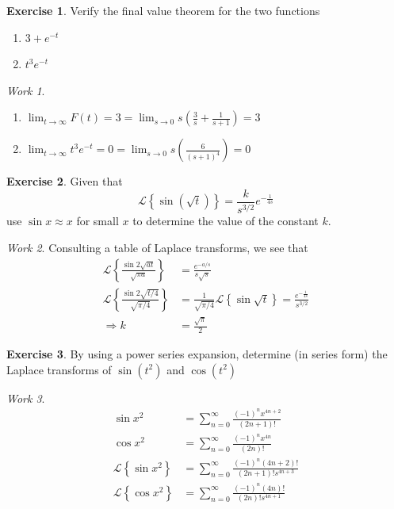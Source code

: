 \documentclass{report}
\theoremstyle{definition}
\newtheorem{exercise}{Exercise}[chapter]
\theoremstyle{remark}
\newtheorem*{work}{Work}
\newcommand{\lapt}[1]{\mathscr{L}\left\{ #1\right\}}
\begin{document}
\begin{exercise}
    Verify the final value theorem for the two functions
    \begin{enumerate}[label = (\alph*)]
        \item $3+e^{-t}$
        \item $t^3e^{-t}$
    \end{enumerate}
\end{exercise}
\begin{work}
\leavevmode
    \begin{enumerate}[label = (\alph*)]
        \item $\displaystyle{\lim_{t\rightarrow \infty} F(t) = 3 = \lim_{s\rightarrow 0} s\left( \frac{3}{s} + \frac{1}{s+1} \right) = 3}$
        \item $\displaystyle{\lim_{t\rightarrow \infty} t^3e^{-t}} = 0 = \lim_{s\rightarrow 0}s\left( \frac{6}{(s+1)^4} \right) = 0$
    \end{enumerate}
\end{work}

\begin{exercise}
    Given that 
    \begin{equation*}
        \lapt{\sin(\sqrt{t})} = \frac{k}{s^{3/2}}e^{-\frac{1}{4s}}
    \end{equation*}
    use $\sin x \approx x$ for small $x$ to determine the value of the constant $k$.
\end{exercise}
\begin{work}
    Consulting a table of Laplace transforms, we see that 
    \begin{equation*}
    \begin{split}
        \lapt{\frac{\sin 2\sqrt{at}}{\sqrt{\pi a} }} &= \frac{e^{-a/s}}{s\sqrt{s}} \\
        \lapt{\frac{\sin 2 \sqrt{t/4}}{\sqrt{\pi/4}}}& = \frac{1}{\sqrt{\pi/4}}\lapt{\sin\sqrt{t}} =\frac{e^{-\frac{1}{4s}}}{s^{3/2}}\\
        \Rightarrow k &=\frac{\sqrt{\pi}}{2}
    \end{split}
    \end{equation*}
\end{work}

\begin{exercise}
    By using a power series expansion, determine (in series form) the Laplace transforms of $\sin (t^2)$ and $\cos(t^2)$
\end{exercise}
\begin{work}
    \begin{equation*}
        \begin{split}
            \sin x^2 &= \sum^\infty_{n=0} \frac{(-1)^nx^{4n+2}}{(2n+1)!} \\
            \cos x^2 &= \sum^\infty_{n=0} \frac{(-1)^nx^{4n}}{(2n)!} \\
            \lapt{\sin x^2} &= \sum^\infty_{n=0} \frac{(-1)^n (4n+2)!}{(2n+1)!s^{4n+3}}\\
            \lapt{\cos x^2} &= \sum^\infty_{n=0} \frac{(-1)^n(4n)!}{(2n)!s^{4n+1}}
        \end{split}
    \end{equation*}
\end{work}
\end{document}
